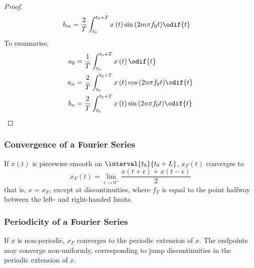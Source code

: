 \documentclass{article}
\begin{document}
\begin{proof}
\begin{align*}
        b_m                                                                                & = \frac{2}{T} \int_{t_0}^{t_0 + T} x\left( t \right) \sin{\left( 2 m \pi f_0 t \right)} \odif{t}
    \end{align*}
    To summarise,
    \begin{align*}
        a_0 & = \frac{1}{T} \int_{t_0}^{t_0 + T} x\left( t \right) \odif{t}                                    \\
        a_n & = \frac{2}{T} \int_{t_0}^{t_0 + T} x\left( t \right) \cos{\left( 2 n \pi f_0 t \right)} \odif{t} \\
        b_n & = \frac{2}{T} \int_{t_0}^{t_0 + T} x\left( t \right) \sin{\left( 2 n \pi f_0 t \right)} \odif{t}
    \end{align*}
\end{proof}
\subsubsection{Convergence of a Fourier Series}
If \(x\left( t \right)\) is piecewise smooth on \(\interval{t_0}{t_0 + L}\), \(x_F\left( t \right)\)
converges to
\begin{equation*}
    x_F\left( t \right) = \lim_{\epsilon \to 0^{+}} \frac{x\left( t + \epsilon \right) + x\left( t - \epsilon \right)}{2}
\end{equation*}
that is, \(x = x_F\), except at discontinuities, where \(f_F\) is equal to the point halfway between the left- and right-handed limits.
\subsubsection{Periodicity of a Fourier Series}
If \(x\) is non-periodic, \(x_F\) converges to the periodic extension of \(x\). The endpoints may converge non-uniformly,
corresponding to jump discontinuities in the periodic extension of \(x\).
\end{document}
